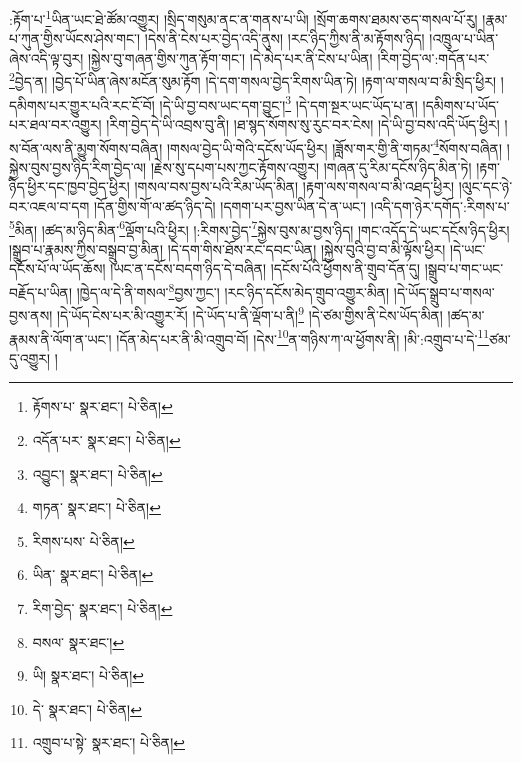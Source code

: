 :རྟོག་པ་\footnote{རྟོགས་པ་  སྣར་ཐང་།  པེ་ཅིན། }ཡིན་ཡང་ཐེ་ཚོམ་འགྱུར། །སྲིད་གསུམ་ནང་ན་གནས་པ་ཡི། །སྲོག་ཆགས་ཐམས་ཅད་གསལ་པོ་རུ། །རྣམ་པ་ཀུན་གྱིས་ཡོངས་ཤེས་གང་། །དེས་ནི་ངེས་པར་བྱེད་འདི་ནུས། །རང་ཉིད་ཀྱིས་ནི་མ་རྟོགས་ཉིད། །འཁྲུལ་པ་ཡིན་ཞེས་འདི་ལྟ་བུར། །སྐྱེས་བུ་གཞན་གྱིས་ཀུན་རྟོག་གང་། །དེ་མེད་པར་ནི་ངེས་པ་ཡིན། །རིག་བྱེད་ལ་:གདོན་པར་\footnote{འདོན་པར་  སྣར་ཐང་།  པེ་ཅིན། }བྱེད་ན། །བྱེད་པོ་ཡིན་ཞེས་མངོན་སུམ་རྟོག །དེ་དག་གསལ་བྱེད་རིགས་ཡིན་ཏེ། །རྟག་ལ་གསལ་བ་མི་སྲིད་ཕྱིར། །དམིགས་པར་གྱུར་པའི་རང་ངོ་བོ། །དེ་ཡི་བྱ་བས་ཡང་དག་བྱུང་།\footnote{འབྱུང་།  སྣར་ཐང་།  པེ་ཅིན། } །དེ་དག་སྔར་ཡང་ཡོད་པ་ན། །དམིགས་པ་ཡོད་པར་ཐལ་བར་འགྱུར། །རིག་བྱེད་དེ་ཡི་འབྲས་བུ་ནི། །ཐ་སྙད་སོགས་སུ་རུང་བར་ངེས། །དེ་ཡི་བྱ་བས་འདི་ཡོད་ཕྱིར། །ས་བོན་ལས་ནི་མྱུག་སོགས་བཞིན། །གསལ་བྱེད་ཡི་གེའི་དངོས་ཡོད་ཕྱིར། །ཟློས་གར་གྱི་ནི་གཏམ་\footnote{གཏན་  སྣར་ཐང་།  པེ་ཅིན། }སོགས་བཞིན། །སྐྱེས་བུས་བྱས་ཉིད་རིག་བྱེད་ལ། །རྗེས་སུ་དཔག་པས་ཀྱང་རྟོགས་འགྱུར། །གཞན་དུ་རིམ་དངོས་ཉིད་མིན་ཏེ། །རྟག་ཉིད་ཕྱིར་དང་ཁྱབ་བྱེད་ཕྱིར། །གསལ་བས་བྱས་པའི་རིམ་ཡོད་མིན། །རྟག་ལས་གསལ་བ་མི་འཐད་ཕྱིར། །ལུང་དང་ཉེ་བར་འཇལ་བ་དག །དོན་གྱིས་གོ་ལ་ཚད་ཉིད་དེ། །དགག་པར་བྱས་ཡིན་དེ་ན་ཡང་། །འདི་དག་ཉེར་དགོད་:རིགས་པ་\footnote{རིགས་པས་  པེ་ཅིན། }མིན། །ཚད་མ་ཉིད་མིན་\footnote{ཡིན་  སྣར་ཐང་།  པེ་ཅིན། }ལྡོག་པའི་ཕྱིར། །:རིགས་བྱེད་\footnote{རིག་བྱེད་  སྣར་ཐང་།  པེ་ཅིན། }སྐྱེས་བུས་མ་བྱས་ཉིད། །གང་འདོད་དེ་ཡང་དངོས་ཉིད་ཕྱིར། །སྒྲུབ་པ་རྣམས་ཀྱིས་བསྒྲུབ་བྱ་མིན། །དེ་དག་གིས་ཐོས་རང་དབང་ཡིན། །སྐྱེས་བུའི་བྱ་བ་མི་ལྟོས་ཕྱིར། །དེ་ཡང་དངོས་པོ་ལ་ཡོད་ཆོས། །ཡང་ན་དངོས་བདག་ཉིད་དེ་བཞིན། །དངོས་པོའི་ཕྱོགས་ནི་གྲུབ་དོན་དུ། །སྒྲུབ་པ་གང་ཡང་བརྗོད་པ་ཡིན། །ཁྱེད་ལ་དེ་ནི་གསལ་\footnote{བསལ་  སྣར་ཐང་། }བྱས་ཀྱང་། །རང་ཉིད་དངོས་མེད་གྲུབ་འགྱུར་མིན། །དེ་ཡོད་སྒྲུབ་པ་གསལ་བྱས་ནས། །དེ་ཡོད་ངེས་པར་མི་འགྱུར་རོ། །དེ་ཡོད་པ་ནི་ལྡོག་པ་ནི།\footnote{ཡི།  སྣར་ཐང་།  པེ་ཅིན། } །དེ་ཙམ་གྱིས་ནི་ངེས་ཡོད་མིན། །ཚད་མ་རྣམས་ནི་ལོག་ན་ཡང་། །དོན་མེད་པར་ནི་མི་འགྲུབ་བོ། །དེས་\footnote{དེ་  སྣར་ཐང་།  པེ་ཅིན། }ན་གཉིས་ཀ་ལ་ཕྱོགས་ནི། །མི་:འགྲུབ་པ་དེ་\footnote{འགྲུབ་པ་སྟེ་  སྣར་ཐང་།  པེ་ཅིན། }ཙམ་དུ་འགྱུར། །
